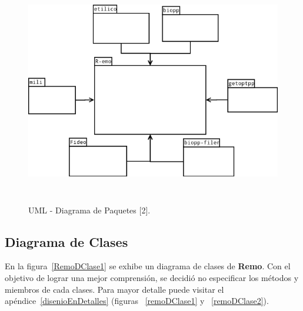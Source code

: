 \begin{figure}[!hbtp]
	\begin{center}
		\vskip 1cm
		\hspace*{1cm}\includegraphics[width=13.5cm, height=10cm]{image/packageDiagramHighGranularity.png}
		\caption{UML - Diagrama de Paquetes [2].}
		\label{paquetesDiag}
	\end{center}
\end{figure}

\subsection{Diagrama de Clases}
\par En la figura~\ref{RemoDClase1} se exhibe un diagrama de clases de \textbf{Remo}. Con el objetivo de lograr una mejor comprensión, se decidió no especificar los métodos y miembros de cada clases. Para mayor detalle puede visitar el apéndice~\ref{disenioEnDetalles} (figuras ~\ref{remoDClase1} y ~\ref{remoDClase2}).

